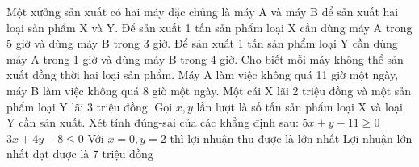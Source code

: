 \begin{ex}
 Một xưởng sản xuất có hai máy đặc chủng là máy A và máy B để sản xuất hai loại sản phẩm X và Y. Để sản xuất 1 tấn sản phẩm loại X cần dùng máy A trong 5 giờ và dùng máy B trong 3 giờ. Để sản xuất 1 tấn sản phẩm loại Y cần dùng máy A trong 1 giờ và dùng máy B trong 4 giờ. Cho biết mỗi máy không thể sản xuất đồng thời hai loại sản phẩm. Máy A làm việc không quá 11 giờ một ngày, máy B làm việc không quá 8 giờ một ngày. Một cái X lãi 2 triệu đồng và một sản phẩm loại Y lãi 3 triệu đồng. Gọi ${x,y}$ lần lượt là số tấn sản phẩm loại X và loại Y cần sản xuất. Xét tính đúng-sai của các khẳng định sau:
\choiceTFt
{ $5 x + y - 11 \ge 0$ }
   { \True  $3 x + 4 y - 8 \le 0$ }
     { \True  Với $x = 0, y = 2$ thì lợi nhuận thu được là lớn nhất }
    { Lợi nhuận lớn nhất đạt được là 7 triệu đồng  }
\end{ex}


